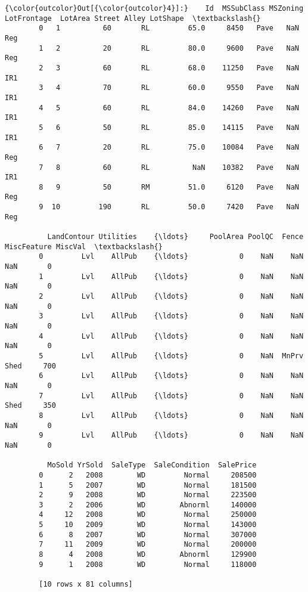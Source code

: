 \documentclass[11pt]{article}
\begin{document}
\begin{Verbatim}[commandchars=\\\{\}]
{\color{outcolor}Out[{\color{outcolor}4}]:}    Id  MSSubClass MSZoning  LotFrontage  LotArea Street Alley LotShape  \textbackslash{}
        0   1          60       RL         65.0     8450   Pave   NaN      Reg   
        1   2          20       RL         80.0     9600   Pave   NaN      Reg   
        2   3          60       RL         68.0    11250   Pave   NaN      IR1   
        3   4          70       RL         60.0     9550   Pave   NaN      IR1   
        4   5          60       RL         84.0    14260   Pave   NaN      IR1   
        5   6          50       RL         85.0    14115   Pave   NaN      IR1   
        6   7          20       RL         75.0    10084   Pave   NaN      Reg   
        7   8          60       RL          NaN    10382   Pave   NaN      IR1   
        8   9          50       RM         51.0     6120   Pave   NaN      Reg   
        9  10         190       RL         50.0     7420   Pave   NaN      Reg   
        
          LandContour Utilities    {\ldots}     PoolArea PoolQC  Fence MiscFeature MiscVal  \textbackslash{}
        0         Lvl    AllPub    {\ldots}            0    NaN    NaN         NaN       0   
        1         Lvl    AllPub    {\ldots}            0    NaN    NaN         NaN       0   
        2         Lvl    AllPub    {\ldots}            0    NaN    NaN         NaN       0   
        3         Lvl    AllPub    {\ldots}            0    NaN    NaN         NaN       0   
        4         Lvl    AllPub    {\ldots}            0    NaN    NaN         NaN       0   
        5         Lvl    AllPub    {\ldots}            0    NaN  MnPrv        Shed     700   
        6         Lvl    AllPub    {\ldots}            0    NaN    NaN         NaN       0   
        7         Lvl    AllPub    {\ldots}            0    NaN    NaN        Shed     350   
        8         Lvl    AllPub    {\ldots}            0    NaN    NaN         NaN       0   
        9         Lvl    AllPub    {\ldots}            0    NaN    NaN         NaN       0   
        
          MoSold YrSold  SaleType  SaleCondition  SalePrice  
        0      2   2008        WD         Normal     208500  
        1      5   2007        WD         Normal     181500  
        2      9   2008        WD         Normal     223500  
        3      2   2006        WD        Abnorml     140000  
        4     12   2008        WD         Normal     250000  
        5     10   2009        WD         Normal     143000  
        6      8   2007        WD         Normal     307000  
        7     11   2009        WD         Normal     200000  
        8      4   2008        WD        Abnorml     129900  
        9      1   2008        WD         Normal     118000  
        
        [10 rows x 81 columns]
\end{Verbatim}
            
\end{document}
